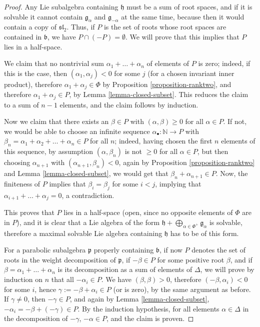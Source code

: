 \begin{proof}
 Any Lie subalgebra containing $\mathfrak h$ must be a sum of root spaces, and if it is solvable it cannot contain $\mathfrak g_\alpha$ and $\mathfrak g_{-\alpha}$ at the same time, because then it would contain a copy of $\mathfrak{sl}_2$. Thus, if $P$ is the set of roots whose root spaces are contained in $\mathfrak b$, we have $P\cap (-P)=\emptyset$. We will prove that this implies that $P$ lies in a half-space. 
 
 We claim that no nontrivial sum $\alpha_1+\dots+\alpha_n$ of elements of $P$ is zero; indeed, if this is the case, then $(\alpha_1, \alpha_j) <0$ for some $j$ (for a chosen invariant inner product), therefore $\alpha_1+\alpha_j\in \Phi$ by Proposition \ref{proposition-ranktwo}, and therefore $\alpha_1+\alpha_j\in P$, by Lemma \ref{lemma-closed-subset}. This reduces the claim to a sum of $n-1$ elements, and the claim follows by induction. 
 
 Now we claim that there exists an $\beta\in P$ with $(\alpha,\beta)\ge 0$ for all $\alpha\in P$. If not, we would be able to choose an infinite sequence $\alpha_\bullet: \mathbb N \to P$ with $\beta_n=\alpha_1 + \alpha_2+\dots+\alpha_n \in P$ for all $n$; indeed, having chosen the first $n$ elements of this sequence, by assumption $(\alpha,\beta_n)$ is not $\ge 0$ for all $\alpha\in P$, but then choosing $\alpha_{n+1}$ with $(\alpha_{n+1},\beta_n)<0$, again by Proposition \ref{proposition-ranktwo} and Lemma \ref{lemma-closed-subset}, we would get that $\beta_n+\alpha_{n+1} \in P$. Now, the finiteness of $P$ implies that $\beta_i = \beta_j$ for some $i< j$, implying that $\alpha_{i+1} + \dots + \alpha_j=0$, a contradiction. 
 
 This proves that $P$ lies in a half-space (open, since no opposite elements of $\Phi$ are in $P$), and it is clear that a Lie algebra of the form $\mathfrak h + \bigoplus_{\alpha\in\Phi^+} \mathfrak g_\alpha$ is solvable, therefore a maximal solvable Lie algebra containing $\mathfrak h$ has to be of this form.
 
 For a parabolic subalgebra $\mathfrak p$ properly containing $\mathfrak b$, if now $P$ denotes the set of roots in the weight decomposition of $\mathfrak p$, if $-\beta\in P$ for some positive root $\beta$, and if $\beta = \alpha_1+\dots+\alpha_n$ is its decomposition as a sum of elements of $\Delta$, we will prove by induction on $n$ that all $-\alpha_i \in P$. We have $(\beta,\beta)>0$, therefore $(-\beta, \alpha_i)<0$ for some $i$, hence $\gamma:=-\beta+\alpha_i \in P$ (or is zero), by the same argument as before. If $\gamma\ne 0$, then $-\gamma \in P$, and again by Lemma \ref{lemma-closed-subset}, $-\alpha_i = -\beta +(-\gamma)\in P$.  By the induction hypothesis, for all elements $\alpha\in \Delta$ in the decomposition of $-\gamma$, $-\alpha\in P$, and the claim is proven.
 

\end{proof}
